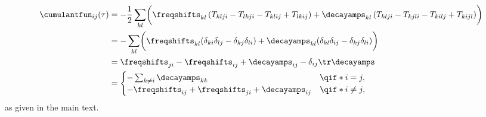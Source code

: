 \begin{align}
    \cumulantfun_{ij}(\tau) &= -\frac{1}{2}\sum_{kl}\biggl(\freqshifts_{kl}\left(T_{klji} - T_{lkji} - T_{klij} + T_{lkij}\right)
                                               + \decayamps_{kl}\left(T_{klji} - T_{kjli} - T_{kilj} + T_{kijl}\right)\biggr) \\
                            &= -\sum_{kl}\biggl(\freqshifts_{kl}(\delta_{ki}\delta_{lj} - \delta_{kj}\delta_{li})
                                               + \decayamps_{kl}(\delta_{kl}\delta_{ij} - \delta_{kj}\delta_{li})\biggr) \\
                            &= \freqshifts_{ji} - \freqshifts_{ij} + \decayamps_{ij} - \delta_{ij}\tr\decayamps \\
                            &= \begin{cases}
                                  - \sum_{k\neq i}\decayamps_{kk}                           &\qif* i = j,   \\
                                  - \freqshifts_{ij} + \freqshifts_{ji} + \decayamps_{ij}   &\qif* i\neq j,
                               \end{cases}
\end{align}
as given in the main text.

